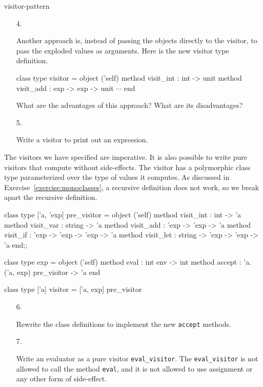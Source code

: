\begin{exercise}{visitor-pattern}
\begin{enumerate}
\item[4.]

Another approach is, instead of passing the objects directly to the
visitor, to pass the exploded values as arguments.  Here is the new visitor
type definition.

\begin{ocaml}
class type visitor =
  object ('self)
    method visit_int : int -> unit
    method visit_add : exp -> exp -> unit
    $\cdots$
  end
\end{ocaml}
%
What are the advantages of this approach?  What are its disadvantages?

\item[5.]

Write a visitor to print out an expression.
\end{enumerate}
%
The visitors we have specified are imperative.  It is also possible to
write pure visitors that compute without side-effects.  The visitor
has a polymorphic class type parameterized over the type of values it
computes.  As discussed in Exercise~\ref{exercise:monoclasses}, a recursive
definition does not work, so we break apart the recursive definition.

\begin{ocaml}
class type ['a, 'exp] pre_visitor =
  object ('self)
    method visit_int : int -> 'a
    method visit_var : string -> 'a
    method visit_add : 'exp -> 'exp -> 'a
    method visit_if  : 'exp -> 'exp -> 'exp -> 'a
    method visit_let : string -> 'exp -> 'exp -> 'a
  end;;

class type exp =
  object ('self)
    method eval   : int env -> int
    method accept : 'a. ('a, exp) pre_visitor -> 'a
  end

class type ['a] visitor = ['a, exp] pre_visitor
\end{ocaml}

\begin{enumerate}
\item[6.]

Rewrite the class definitions to implement the new \hbox{\lstinline$accept$} methods.

\item[7.]

Write an evaluator as a pure visitor \hbox{\lstinline$eval_visitor$}.
The \hbox{\lstinline$eval_visitor$} is not allowed to call the
method \hbox{\lstinline$eval$}, and it is not allowed to use assignment or
any other form of side-effect.
\end{enumerate}


\end{exercise}
